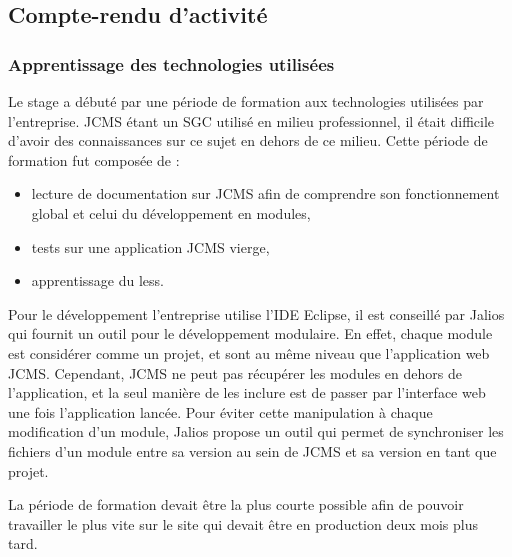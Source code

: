 \documentclass[12pt,a4paper]{article}
\begin{document}
\newpage
\subsection{Compte-rendu d'activité}
\subsubsection{Apprentissage des technologies utilisées}
Le stage a débuté par une période de formation aux technologies utilisées par l'entreprise. \gls{JCMS} étant un SGC utilisé en milieu professionnel, il était difficile d'avoir des connaissances sur ce sujet en dehors de ce milieu. Cette période de formation fut composée de :
\begin{itemize}
\item lecture de documentation sur \gls{JCMS} afin de comprendre son fonctionnement global et celui du développement en modules,
\item tests sur une application \gls{JCMS} vierge,
\item apprentissage du less.
\end{itemize}\par 
Pour le développement l'entreprise utilise l'IDE Eclipse, il est conseillé par Jalios qui fournit un outil pour le développement modulaire. En effet, chaque module est considérer comme un projet, et sont au même niveau que l'application web \gls{JCMS}. Cependant, \gls{JCMS} ne peut pas récupérer les modules en dehors de l'application, et la seul manière de les inclure est de passer par l'interface web une fois l'application lancée. Pour éviter cette manipulation à chaque modification d'un module, Jalios propose un outil qui permet de synchroniser les fichiers d'un module entre sa version au sein de \gls{JCMS} et sa version en tant que projet.\par
La période de formation devait être la plus courte possible afin de pouvoir travailler le plus vite sur le site qui devait être en production deux mois plus tard. \par
\end{document}
